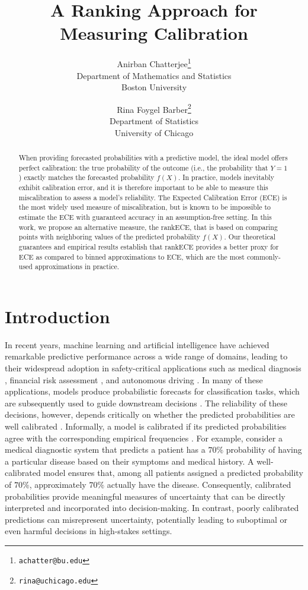 \documentclass[11pt]{article}
\title{A Ranking Approach for Measuring Calibration}
\author{
Anirban Chatterjee\thanks{\texttt{achatter@bu.edu}}\\
Department of Mathematics and Statistics\\ Boston University
\and
Rina Foygel Barber\thanks{\texttt{rina@uchicago.edu}}\\
Department of Statistics\\ University of Chicago
}
\date{}
\numberwithin{equation}{section}
\theoremstyle{definition}
\begin{document}
\maketitle

\begin{abstract}
When providing forecasted probabilities with a predictive model, the ideal model offers perfect calibration: the true probability of the outcome (i.e., the probability that $Y=1$) exactly matches the forecasted probability $f(X)$. In practice, models inevitably exhibit calibration error, and it is therefore important to be able to measure this miscalibration to assess a model's reliability. The Expected Calibration Error (ECE) is the most widely used measure of miscalibration, but is known to be impossible to estimate the ECE with guaranteed accuracy in an assumption-free setting. In this work, we propose an alternative measure, the rankECE, that is based on comparing points with neighboring values of the predicted probability $f(X)$. Our theoretical guarantees and empirical results establish that rankECE provides a better proxy for ECE as compared to binned approximations to ECE, which are the most commonly-used approximations in practice.
\end{abstract}

\section{Introduction}\label{sec:intro}

In recent years, machine learning and artificial intelligence have achieved remarkable predictive performance across a wide range of domains, leading to their widespread adoption in safety-critical applications such as medical diagnosis \citep{esteva2017dermatologist,esteva2019guide,gulshan2016development}, financial risk assessment \citep{baesens2003benchmarking,fritz2022financial}, and autonomous driving \citep{caesar2020nuscenes,sun2020scalability,chen2024end}. In many of these applications, models produce probabilistic forecasts for classification tasks, which are subsequently used to guide downstream decisions \citep{turay2022toward,cai2020review,mahbobi2023credit}. The reliability of these decisions, however, depends critically on whether the predicted probabilities are well calibrated \citep{murphy1977reliability,vanCalster2019CalibrationTA,shen2025algorithms}. Informally, a model is calibrated if its predicted probabilities agree with the corresponding empirical frequencies \citep{foster1998asymptotic,dawid1982well}. For example, consider a medical diagnostic system that predicts a patient has a $70\%$ probability of having a particular disease based on their symptoms and medical history. A well-calibrated model ensures that, among all patients assigned a predicted probability of $70\%$, approximately $70\%$ actually have the disease. Consequently, calibrated probabilities provide meaningful measures of uncertainty that can be directly interpreted and incorporated into decision-making. In contrast, poorly calibrated predictions can misrepresent uncertainty, potentially leading to suboptimal or even harmful decisions in high-stakes settings.
\end{document}
